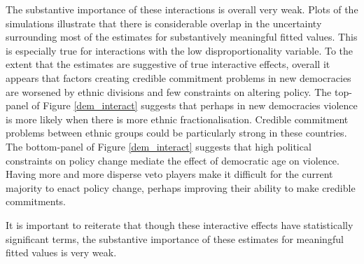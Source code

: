 \documentclass[a4paper]{article}\usepackage[]{graphicx}\usepackage[]{color}
\begin{document}
The substantive importance of these interactions is overall very weak. Plots of the simulations illustrate that there is considerable overlap in the uncertainty surrounding most of the estimates for substantively meaningful fitted values. This is especially true for interactions with the low disproportionality variable. To the extent that the estimates are suggestive of true interactive effects, overall it appears that factors creating credible commitment problems in new democracies are worsened by ethnic divisions and few constraints on altering policy. The top-panel of Figure \ref{dem_interact} suggests that perhaps in new democracies violence is more likely when there is more ethnic fractionalisation. Credible commitment problems between ethnic groups could be particularly strong in these countries. The bottom-panel of Figure \ref{dem_interact} suggests that high political constraints on policy change mediate the effect of democratic age on violence. Having more and more disperse veto players make it difficult for the current majority to enact policy change, perhaps improving their ability to make credible commitments.

It is important to reiterate that though these interactive effects have statistically significant terms, the substantive importance of these estimates for meaningful fitted values is very weak.
\end{document}
